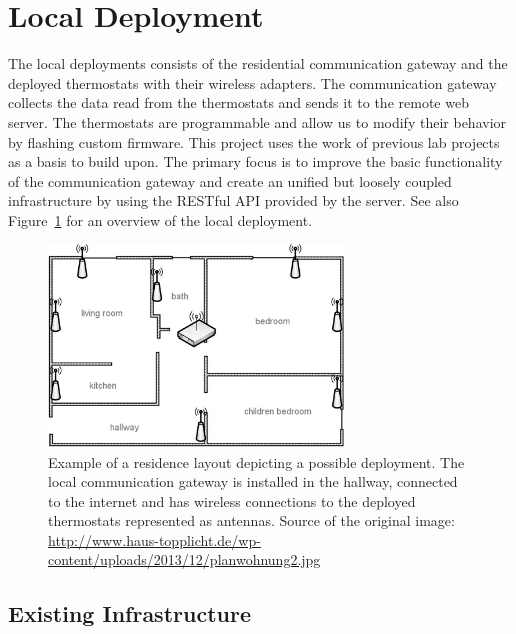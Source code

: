 
\section{Local Deployment}
\label{sec:local_infrastructure}

The local deployments consists of the residential communication gateway and the deployed thermostats with their wireless adapters.
The communication gateway collects the data read from the thermostats and sends it to the remote web server.
The thermostats are programmable and allow us to modify their behavior by flashing custom firmware.
This project uses the work of previous lab projects as a basis to build upon.
The primary focus is to improve the basic functionality of the communication gateway and create an unified but loosely coupled infrastructure by using the RESTful API provided by the server.
See also Figure~\ref{fig:residence_layout} for an overview of the local deployment.

\begin{figure}[h]
	\begin{center}
		\includegraphics[width=0.7\textwidth]{images/residence_layout_schema.png}
	\end{center}
	\caption{Example of a residence layout depicting a possible deployment. The local communication gateway is installed in the hallway, connected to the internet and has wireless connections to the deployed thermostats represented as antennas. Source of the original image: \url{http://www.haus-topplicht.de/wp-content/uploads/2013/12/planwohnung2.jpg}}
	\label{fig:residence_layout}
\end{figure}

\subsection{Existing Infrastructure}

